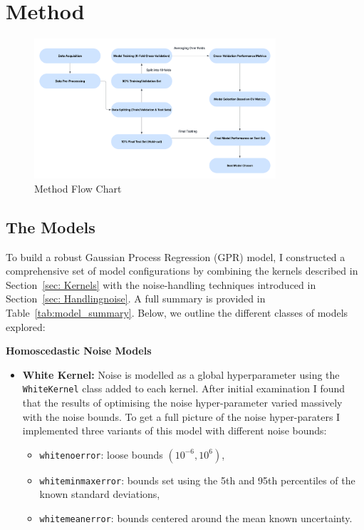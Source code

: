 \documentclass[12pt]{article}
\begin{document}
\section{Method}
\begin{figure}[H]
    \centering
   \includegraphics[width=0.8\textwidth]{LatexPlots/Flowchart.png}
    \caption{Method Flow Chart}
    \label{fig:flowchart}
\end{figure}
\subsection{The Models}
\label{subsec:Models}
To build a robust Gaussian Process Regression (GPR) model, I constructed a comprehensive set of model configurations by combining the kernels described in Section~\ref{sec: Kernels} with the noise-handling techniques introduced in Section~\ref{sec: Handlingnoise}. 
A full summary is provided in Table~\ref{tab:model_summary}. Below, we outline the different classes of models explored:

\noindent
\textbf{Homoscedastic Noise Models}
\begin{itemize}
    \item \textbf{White Kernel:} Noise is modelled as a global hyperparameter using the \texttt{WhiteKernel} class added to each kernel. After initial examination I found that the results of optimising the noise hyper-parameter varied massively with the noise bounds. 
    To get a full picture of the noise hyper-paraters I implemented three variants of this model with different noise bounds:
    \begin{itemize}
        \item \texttt{whitenoerror}: loose bounds \((10^{-6}, 10^6)\),
        \item \texttt{whiteminmaxerror}: bounds set using the 5th and 95th percentiles of the known standard deviations,
        \item \texttt{whitemeanerror}: bounds centered around the mean known uncertainty.
    \end{itemize}
\end{itemize}
%
%
\end{document}
